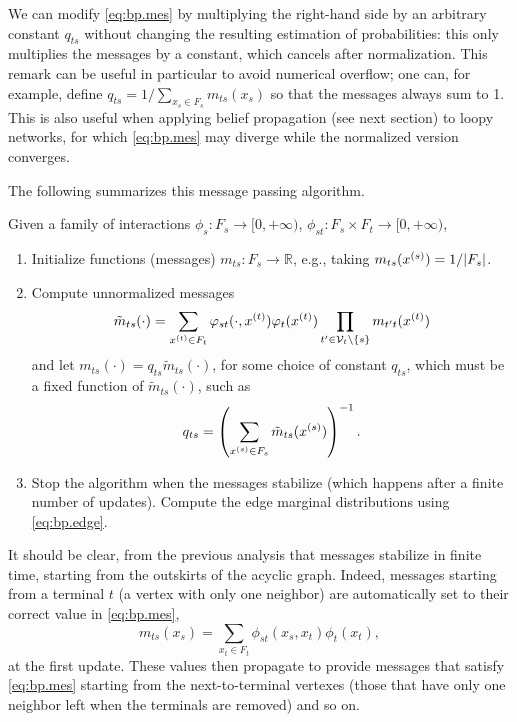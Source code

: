 \begin{remark}
\label{rem:bp.normalize}
We can modify \cref{eq:bp.mes} by multiplying the right-hand side by
an arbitrary constant $q_{ts}$ without changing the resulting
estimation of probabilities: this only multiplies the messages by a
constant, which cancels after normalization. This remark can be useful
in particular to avoid numerical overflow; one can,
for example, define $q_{ts} = 1/\sum_{x_s\in F_s} m_{ts}(x_s)$ so
that the messages always sum to 1. This is also useful when applying
belief propagation (see next section) to loopy networks, for which \cref{eq:bp.mes} may
diverge while the normalized version converges. 
\end{remark}

The following summarizes this message passing algorithm.

\begin{algorithm}
\label{alg:message.tree}
Given a family of interactions $\phi_s: F_s \to [0, +\infty)$, $\phi_{st}: F_s \times F_t \to [0, +\infty)$,
\begin{enumerate}
\item Initialize functions (messages) $m_{ts}: F_s \to \mathbb R$, e.g., taking $m_{ts}(x^{(s)}) = 1/|F_s|$.
\item Compute unnormalized messages 
\[
\tilde m_{ts}(\cdot) = \sum_{x^{(t)}\in F_{t}} \varphi_{st}(\cdot, x^{(t)}) \varphi_t(x^{(t)}) \prod_{t'\in{\mathcal V}_t\setminus \{s\}} m_{t't}(x^{(t)})
\]
and  let $m_{ts}(\cdot) = q_{ts} \tilde m_{ts}(\cdot)$, 
for some choice of constant $q_{ts}$, which must be a fixed function of $\tilde m_{ts}(\cdot)$, such as
\[
q_{ts} = \left(\sum_{x^{(s)}\in F_s} \tilde m_{ts}(x^{(s)})\right)^{-1}.
\]
\item Stop the algorithm when the messages  stabilize (which happens after a finite number of updates). Compute the edge marginal distributions using \cref{eq:bp.edge}. 
\end{enumerate}
\end{algorithm}
It should be clear, from the previous analysis that messages stabilize in finite time, starting from the outskirts of the acyclic graph. Indeed,  messages starting from a terminal $t$ (a
vertex with only one neighbor) are
automatically set to their correct value in \cref{eq:bp.mes},
$$
m_{ts}(x_s) = \sum_{x_{t}\in F_{t}} \phi_{st}(x_s, x_{t}) \phi_t(x_t),
$$
at the first update. These values then propagate to provide messages
that satisfy \cref{eq:bp.mes}
starting from the next-to-terminal vertexes (those that have only one
neighbor left when the terminals are removed) and so on.


